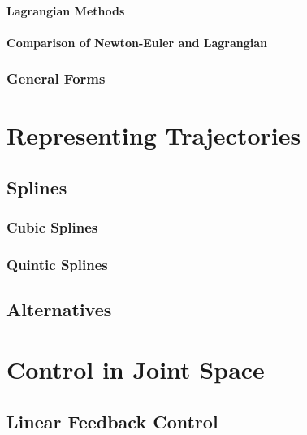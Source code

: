 				\paragraph{Lagrangian Methods} %

				\paragraph{Comparison of Newton-Euler and Lagrangian} %

			\subsubsection{General Forms} %

	\section{Representing Trajectories} %

		\subsection{Splines} %

			\subsubsection{Cubic Splines} %

			\subsubsection{Quintic Splines} %

		\subsection{Alternatives} %

	\section{Control in Joint Space} %

		\subsection{Linear Feedback Control} %

